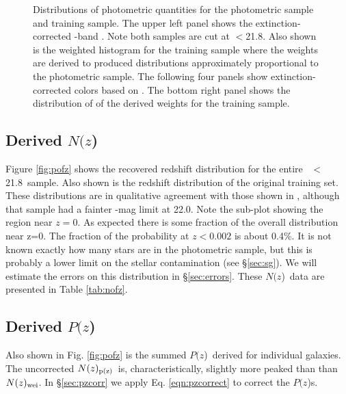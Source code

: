 \documentclass[preprint]{aastex}
\newcommand{\rmax}{21.8}
\newcommand{\pofz}{$P(z$)}
\newcommand{\nofz}{$N(z$)}
\newcommand{\nwei}{N(z)_{\rm wei}}
\newcommand{\npz}{N(z)_{\rm p(z)}}
\begin{document}
\begin{figure}[p] \centering

    \caption{Distributions of photometric quantities for the photometric sample
    and training sample.  The upper left panel shows the extinction-corrected
    \rmag-band \cmodelmag.  Note both samples are cut at \rmag$ < $\rmax.  
    Also shown is the weighted histogram for the training sample where
    the weights are derived to produced distributions approximately 
    proportional to the photometric sample.
    The following four panels show extinction-corrected colors based on
    \modelmag.  The bottom right panel shows the distribution of of the
    derived weights for the training sample. }
    \label{fig:varhist}

    \vspace{2em}
\end{figure}

\subsection{Derived \nofz}

Figure \ref{fig:pofz} shows the recovered redshift distribution for the entire
\rmag\ $<$ \rmax\ sample.  Also shown is the redshift distribution of the
original training set.  These distributions are in qualitative agreement with
those shown in \citet{CunhaPhotoz09}, although that sample had a fainter
\rmag-mag limit at 22.0.  Note the sub-plot showing the region near $z=0$.  As
expected there is some fraction of the overall distribution near z=0.  The
fraction of the probability at $z < 0.002$ is about 0.4\%.  It is not known exactly how many
stars are in the photometric sample, but this is probably a lower limit on the
stellar contamination (see \S \ref{sec:sg}).  We will estimate the errors on
this distribution in \S \ref{sec:errors}. These \nofz\ data are presented in
Table \ref{tab:nofz}.


\subsection{Derived \pofz}

Also shown in Fig. \ref{fig:pofz} is the summed \pofz\ derived for individual
galaxies.  The uncorrected $\npz$\ is, characteristically, slightly more peaked than
than $\nwei$.
In \S \ref{sec:pzcorr} we apply Eq. \ref{eqn:pzcorrect} to correct the \pofz s.
\end{document}
